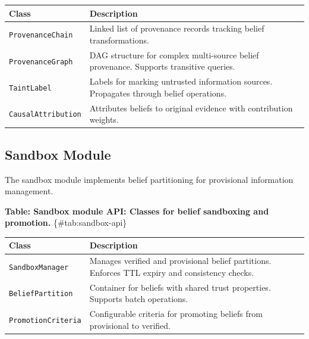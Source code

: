 \documentclass[
]{article}
\newcounter{none} %
\begin{document}
{\def\LTcaptype{none} %
\begin{longtable}[]{@{}
  >{\raggedright\arraybackslash}p{}
  >{\raggedright\arraybackslash}p{}@{}}
\toprule\noalign{}
\begin{minipage}[b]{\linewidth}\raggedright
Class
\end{minipage} & \begin{minipage}[b]{\linewidth}\raggedright
Description
\end{minipage} \\
\midrule\noalign{}
\endhead
\bottomrule\noalign{}
\endlastfoot
\texttt{ProvenanceChain} & Linked list of provenance records tracking
belief transformations. \\
\texttt{ProvenanceGraph} & DAG structure for complex multi-source belief
provenance. Supports transitive queries. \\
\texttt{TaintLabel} & Labels for marking untrusted information sources.
Propagates through belief operations. \\
\texttt{CausalAttribution} & Attributes beliefs to original evidence
with contribution weights. \\
\end{longtable}
}

\subsection{Sandbox Module}\label{sec:sandbox-api}

The sandbox module implements belief partitioning for provisional
information management.

\textbf{Table: Sandbox module API: Classes for belief sandboxing and
promotion.} \{\#tab:sandbox-api\}

{\def\LTcaptype{none} %
\begin{longtable}[]{@{}
  >{\raggedright\arraybackslash}p{}
  >{\raggedright\arraybackslash}p{}@{}}
\toprule\noalign{}
\begin{minipage}[b]{\linewidth}\raggedright
Class
\end{minipage} & \begin{minipage}[b]{\linewidth}\raggedright
Description
\end{minipage} \\
\midrule\noalign{}
\endhead
\bottomrule\noalign{}
\endlastfoot
\texttt{SandboxManager} & Manages verified and provisional belief
partitions. Enforces TTL expiry and consistency checks. \\
\texttt{BeliefPartition} & Container for beliefs with shared trust
properties. Supports batch operations. \\
\texttt{PromotionCriteria} & Configurable criteria for promoting beliefs
from provisional to verified. \\
\end{longtable}
}
\end{document}
